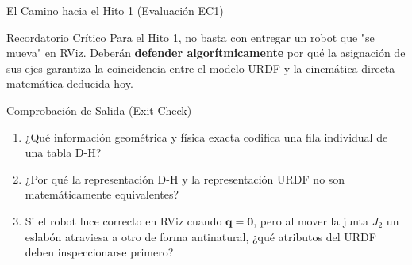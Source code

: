 \documentclass[aspectratio=169, table, xcdraw]{beamer}
\begin{document}
\begin{frame}{El Camino hacia el Hito 1 (Evaluación EC1)}
    \begin{center}
    \end{center}
    
    \vspace{0.4cm}
    \begin{block}{Recordatorio Crítico}
        Para el Hito 1, no basta con entregar un robot que "se mueva" en RViz. Deberán \textbf{defender algorítmicamente} por qué la asignación de sus ejes garantiza la coincidencia entre el modelo URDF y la cinemática directa matemática deducida hoy.
    \end{block}
\end{frame}

\begin{frame}{Comprobación de Salida (Exit Check)}
    \begin{tcolorbox}[colback=white, colframe=ucbblue, title=Análisis Formativo de Cierre]
        \large
        \begin{enumerate}
            \item ¿Qué información geométrica y física exacta codifica una fila individual de una tabla D-H?
            \vspace{0.2cm}
            \item ¿Por qué la representación D-H y la representación URDF no son matemáticamente equivalentes?
            \vspace{0.2cm}
            \item Si el robot luce correcto en RViz cuando $\mathbf{q} = \mathbf{0}$, pero al mover la junta $J_2$ un eslabón atraviesa a otro de forma antinatural, ¿qué atributos del URDF deben inspeccionarse primero?
        \end{enumerate}
    \end{tcolorbox}
\end{frame}
\end{document}
